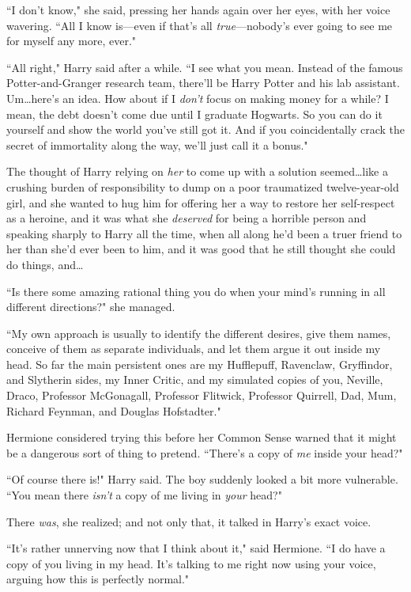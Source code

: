 ``I don't know," she said, pressing her hands again over her eyes, with her voice wavering. ``All I know is—even if that's all \emph{true}—nobody's ever going to see me for myself any more, ever."

``All right," Harry said after a while. ``I see what you mean. Instead of the famous Potter-and-Granger research team, there'll be Harry Potter and his lab assistant. Um…here's an idea. How about if I \emph{don't} focus on making money for a while? I mean, the debt doesn't come due until I graduate Hogwarts. So you can do it yourself and show the world you've still got it. And if you coincidentally crack the secret of immortality along the way, we'll just call it a bonus."

The thought of Harry relying on \emph{her} to come up with a solution seemed…like a crushing burden of responsibility to dump on a poor traumatized twelve-year-old girl, and she wanted to hug him for offering her a way to restore her self-respect as a heroine, and it was what she \emph{deserved} for being a horrible person and speaking sharply to Harry all the time, when all along he'd been a truer friend to her than she'd ever been to him, and it was good that he still thought she could do things, and…

``Is there some amazing rational thing you do when your mind's running in all different directions?" she managed.

``My own approach is usually to identify the different desires, give them names, conceive of them as separate individuals, and let them argue it out inside my head. So far the main persistent ones are my Hufflepuff, Ravenclaw, Gryffindor, and Slytherin sides, my Inner Critic, and my simulated copies of you, Neville, Draco, Professor McGonagall, Professor Flitwick, Professor Quirrell, Dad, Mum, Richard Feynman, and Douglas Hofstadter."

Hermione considered trying this before her Common Sense warned that it might be a dangerous sort of thing to pretend. ``There's a copy of \emph{me} inside your head?"

``Of course there is!" Harry said. The boy suddenly looked a bit more vulnerable. ``You mean there \emph{isn't} a copy of me living in \emph{your} head?"

There \emph{was}, she realized; and not only that, it talked in Harry's exact voice.

``It's rather unnerving now that I think about it," said Hermione. ``I do have a copy of you living in my head. It's talking to me right now using your voice, arguing how this is perfectly normal."

